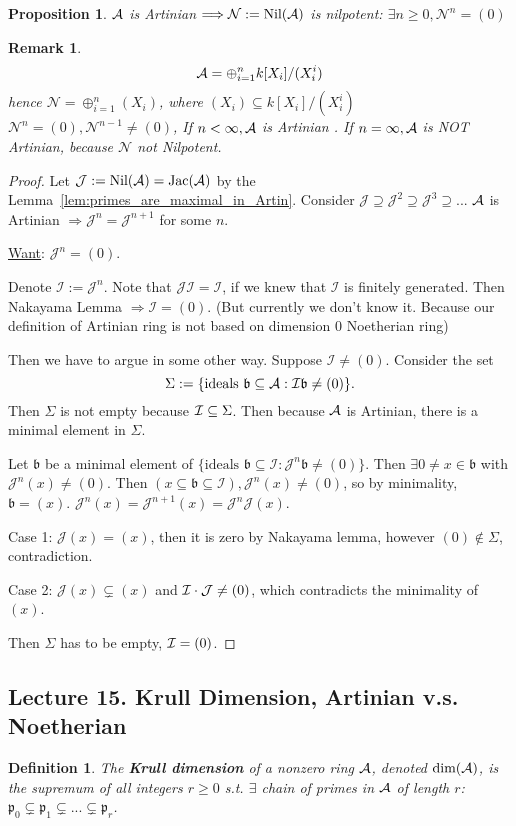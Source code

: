 \documentclass[11pt]{article}
\newtheorem{prop}[thm]{Proposition}
\newtheorem{dfn}[thm]{Definition}
\newtheorem{rmk}[thm]{Remark}
\newcommand{\scb}{{\mathfrak b}}
\newcommand{\scp}{{\mathfrak p}}
\newcommand{\cala}{{\cal A}}
\newcommand{\cali}{{\cal I}}
\newcommand{\Lrta}{\Longrightarrow}
\begin{document}
\begin{prop}\label{prop:Artin_nilpotent_nilradical}
$\cala$ is Artinian   $\Lrta \mathcal{N}:=\text{Nil}(  \cala)$ is nilpotent: $\exists n\geq 0,\mathcal{N}^n=(0)$
\end{prop}
\begin{rmk}
$$
\cala=\oplus^n_{i=1}k[X_i]/(X^i_i)
$$
hence $\mathcal{N}=\oplus^n_{i=1}(X_i)$, where $(X_i)\subseteq k[X_i]/(X^i_i)$ $\mathcal{N}^n=(0), \mathcal{N}^{n-1}\neq (0)$, If $n<\infty, \cala$ is Artinian   . If $n=\infty, \cala$ is NOT Artinian, because $\mathcal{N}$ not Nilpotent.
\end{rmk}

\begin{proof}
Let $\mathcal{J}:= \text{Nil}(  \cala)=\text{Jac}(\cala)$ by the Lemma~\ref{lem:primes_are_maximal_in_Artin}. Consider $\mathcal{J}\supseteq \mathcal{J}^2\supseteq \mathcal{J}^3\supseteq ...$ $\cala$ is Artinian   $\Lrta \mathcal{J}^n=\mathcal{J}^{n+1}$ for some $n$.

 \underline{Want}: $\mathcal{J}^n=(0)$.

Denote $\mathcal{I}:=\mathcal{J}^n$. Note that $\mathcal{J}\mathcal{I}=\mathcal{I}$, if we knew that $\mathcal{I}$ is finitely generated. Then Nakayama Lemma $\Lrta \mathcal{I}=(0)$. (But currently we don't know it. Because our definition of Artinian ring is not based on dimension 0 Noetherian ring)

Then we have to argue in some other way. Suppose $\mathcal{I}\neq (0)$. Consider the set 
$$
\Sigma:=\{\text{ideals } \scb\subseteq \cala: \cali \scb\neq(0)\}.
$$
Then $\Sigma$ is not empty because $\cali\subseteq \Sigma$. Then because $\cala$ is Artinian, there is a minimal element in $\Sigma$.

Let $\scb$ be a minimal element of $\{\text{ideals $\scb\subseteq \mathcal{I}:\mathcal{J}^n\scb\neq (0)$}\}$. Then $\exists 0\neq x\in \scb$ with $\mathcal{J}^n(x)\neq (0)$. Then $(x\subseteq \scb\subseteq \mathcal{I}), \mathcal{J}^n (x)\neq (0)$, so by minimality, $\scb=(x)$.
$\mathcal{J}^n(x)=\mathcal{J}^{n+1}(x)=\mathcal{J}^n\mathcal{J}(x)$.

Case 1: $\mathcal{J}(x)=(x)$, then it is zero by Nakayama lemma, however $(0)\notin \Sigma$, contradiction.

Case 2: $\mathcal{J}(x)\subsetneq (x)$ and $\cali \cdot \mathcal{J}\neq (0)$, which contradicts the minimality of $(x)$. 

Then $\Sigma$ has to be empty, $\cali=(0)$.
\end{proof}
\subsection{Lecture 15. Krull Dimension, Artinian v.s. Noetherian}
\begin{dfn}
The \textbf{Krull dimension} of a nonzero ring $\cala$, denoted $\text{dim}(\cala)$, is the supremum of all integers $r\geq 0$ s.t. $\exists$ chain of primes in $\cala$ of length $r$: 
$\scp_0\subsetneq \scp_1\subsetneq...\subsetneq \scp_r$.
\end{dfn}
\end{document}

